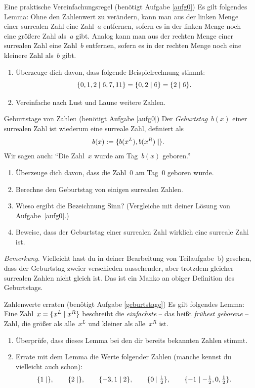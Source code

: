 \documentclass{zirkelblatt}
\begin{document}
\begin{aufgabe}{Eine praktische Vereinfachungsregel (benötigt Aufgabe \ref{aufg0})}
\label{vereinfachungsregel}
Es gilt folgendes Lemma: Ohne den Zahlenwert zu verändern, kann man aus der
linken Menge einer surrealen Zahl eine Zahl~$a$ entfernen, sofern es in der
linken Menge noch eine größere Zahl als~$a$ gibt. Analog kann man aus der
rechten Menge einer surrealen Zahl eine Zahl~$b$ entfernen, sofern es in der
rechten Menge noch eine kleinere Zahl als~$b$ gibt.
\begin{enumerate}
\item Überzeuge dich davon, dass folgende Beispielrechnung stimmt:
\[ \{ 0,1,2 \mathrel{|} 6,7,11 \} = \{ 0,2 \mathrel{|} 6 \} = \{ 2 \mathrel{|} 6 \}. \]
\item Vereinfache nach Lust und Laune weitere Zahlen.
\end{enumerate}
\end{aufgabe}

\begin{aufgabe}{Geburtstage von Zahlen (benötigt Aufgabe \ref{aufg0})}
\label{geburtstage}
Der \emph{Geburtstag}~$b(x)$ einer surrealen Zahl ist wiederum eine surreale
Zahl, definiert als
\[ b(x) := \{ b(x^L), b(x^R) \mathrel{|}  \}. \]
Wir sagen auch: "`Die Zahl~$x$ wurde am Tag~$b(x)$ geboren."'
\begin{enumerate}
\item Überzeuge dich davon, dass die Zahl~$0$ am Tag~$0$ geboren wurde.
\item Berechne den Geburtstag von einigen surrealen Zahlen.
\item Wieso ergibt die Bezeichnung Sinn? (Vergleiche mit deiner Lösung von
Aufgabe~\ref{aufg0}.)
\item Beweise, dass der Geburtstag einer surrealen Zahl wirklich eine surreale
Zahl ist.
\end{enumerate}
\emph{Bemerkung.} Vielleicht hast du in deiner Bearbeitung von Teilaufgabe~b)
gesehen, dass der Geburtstag zweier verschieden aussehender, aber trotzdem
gleicher surrealen Zahlen nicht gleich ist. Das ist ein Manko an obiger
Definition des Geburtstags.
\end{aufgabe}

\begin{aufgabe}{Zahlenwerte erraten (benötigt Aufgabe \ref{geburtstage})}
\label{zahlenraten}
Es gilt folgendes Lemma: Eine Zahl~$x = \{ x^L \mathrel{|} x^R \}$ beschreibt die
\emph{einfachste} -- das heißt \emph{frühest geborene} -- Zahl, die größer als
alle~$x^L$ und kleiner als alle~$x^R$ ist.

\begin{enumerate}
\item Überprüfe, dass dieses Lemma bei den dir bereits bekannten Zahlen stimmt.
\item Errate mit dem Lemma die Werte folgender Zahlen (manche kennst du
vielleicht auch schon):
\[ \{ 1 \mathrel{|}  \}, \qquad
  \{ 2 \mathrel{|}  \}, \qquad
  \{ -3,1 \mathrel{|} 2 \}, \qquad
  \{ 0 \mathrel{|} \tfrac{1}{2} \}, \qquad
  \{ -1 \mathrel{|} -\tfrac{1}{2},0,\tfrac{1}{2} \}. \]
\end{enumerate}
\end{aufgabe}
\end{document}

